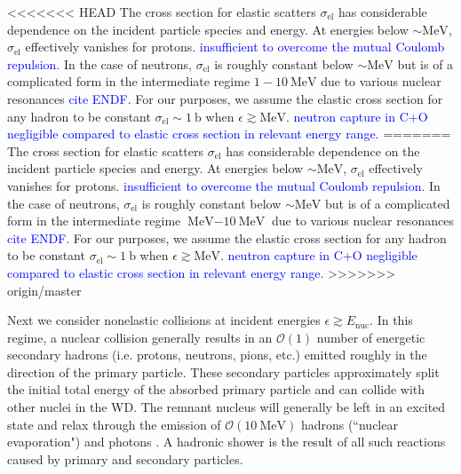 \documentclass[twocolumn,showpacs,preprintnumbers,amsmath,amssymb,prd]{revtex4}
\newcommand{\OO}{\mathcal{O}}
\begin{document}
\begin{appendices}
<<<<<<< HEAD
The cross section for elastic scatters $\sigma_\text{el}$ has considerable dependence on the incident particle species and energy. At energies below $\sim \text{MeV}$, $\sigma_\text{el}$ effectively vanishes for protons. \textcolor{blue}{insufficient to overcome the mutual Coulomb repulsion.} In the case of neutrons, $\sigma_\text{el}$ is roughly constant below $\sim \text{MeV}$ but is of a complicated form in the intermediate regime $1 - 10 ~\text{MeV}$ due to various nuclear resonances \textcolor{blue}{cite ENDF}. For our purposes, we assume the elastic cross section for any hadron to be constant $\sigma_\text{el} \sim 1 ~\text{b}$ when $\epsilon \gtrsim \text{MeV}$. \textcolor{blue}{neutron capture in C+O negligible compared to elastic cross section in relevant energy range.} 
=======
The cross section for elastic scatters $\sigma_\text{el}$ has considerable dependence on the incident particle species and energy. At energies below $\sim \text{MeV}$, $\sigma_\text{el}$ effectively vanishes for protons. \textcolor{blue}{insufficient to overcome the mutual Coulomb repulsion.} In the case of neutrons, $\sigma_\text{el}$ is roughly constant below $\sim \text{MeV}$ but is of a complicated form in the intermediate regime $\text{MeV} - \text{10} ~\text{MeV}$ due to various nuclear resonances \textcolor{blue}{cite ENDF}. For our purposes, we assume the elastic cross section for any hadron to be constant $\sigma_\text{el} \sim 1 ~\text{b}$ when $\epsilon \gtrsim \text{MeV}$. \textcolor{blue}{neutron capture in C+O negligible compared to elastic cross section in relevant energy range.}
>>>>>>> origin/master

Next we consider nonelastic collisions at incident energies $\epsilon \gtrsim E_\text{nuc}$. In this regime, a nuclear collision generally results in an $\OO(1)$ number of energetic secondary hadrons (i.e. protons, neutrons, pions, etc.) emitted roughly in the direction of the primary particle. These secondary particles approximately split the initial total energy of the absorbed primary particle and can collide with other nuclei in the WD. The remnant nucleus will generally be left in an excited state and relax through the emission of $\OO(10 ~\text{MeV})$ hadrons (``nuclear evaporation") and photons \cite{Rossi}. A hadronic shower is the result of all such reactions caused by primary and secondary particles.


\end{appendices}
\end{document}

